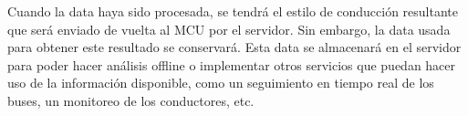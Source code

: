 Cuando la data haya sido procesada, se tendrá el estilo de conducción resultante que será enviado de vuelta al MCU por el servidor. Sin embargo, la data usada para obtener este resultado se conservará. Esta data se almacenará en el servidor para poder hacer análisis offline o implementar otros servicios que puedan hacer uso de la información disponible, como un seguimiento en tiempo real de los buses, un monitoreo de los conductores, etc.
